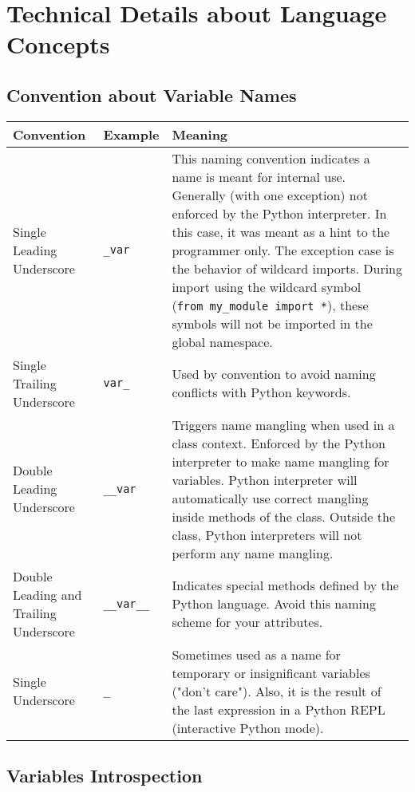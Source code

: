 \documentclass[
]{article}
\begin{document}
\hypertarget{technical-details-about-language-concepts}{%
\section{Technical Details about Language
Concepts}\label{technical-details-about-language-concepts}}

\hypertarget{convention-about-variable-names}{%
\subsection{Convention about Variable
Names}\label{convention-about-variable-names}}

\begin{longtable}[]{@{}lll@{}}
\toprule
\textbf{Convention} & \textbf{Example} & \textbf{Meaning} \\
\midrule
\endhead
Single Leading Underscore & \texttt{\_var} & This naming convention
indicates a name is meant for internal use. Generally (with one
exception) not enforced by the Python interpreter. In this case, it was
meant as a hint to the programmer only. The exception case is the
behavior of wildcard imports. During import using the wildcard symbol
(\texttt{from\ my\_module\ import\ *}), these symbols will not be
imported in the global namespace. \\
Single Trailing Underscore & \texttt{var\_} & Used by convention to
avoid naming conflicts with Python keywords. \\
Double Leading Underscore & \texttt{\_\_var} & Triggers name mangling
when used in a class context. Enforced by the Python interpreter to make
name mangling for variables. Python interpreter will automatically use
correct mangling inside methods of the class. Outside the class, Python
interpreters will not perform any name mangling. \\
Double Leading and Trailing Underscore & \texttt{\_\_var\_\_} &
Indicates special methods defined by the Python language. Avoid this
naming scheme for your attributes. \\
Single Underscore & \texttt{\_} & Sometimes used as a name for temporary
or insignificant variables ("don't care"). Also, it is the result of the
last expression in a Python REPL (interactive Python mode). \\
\bottomrule
\end{longtable}

\hypertarget{variables-introspection}{%
\subsection{Variables Introspection}\label{variables-introspection}}
\end{document}
